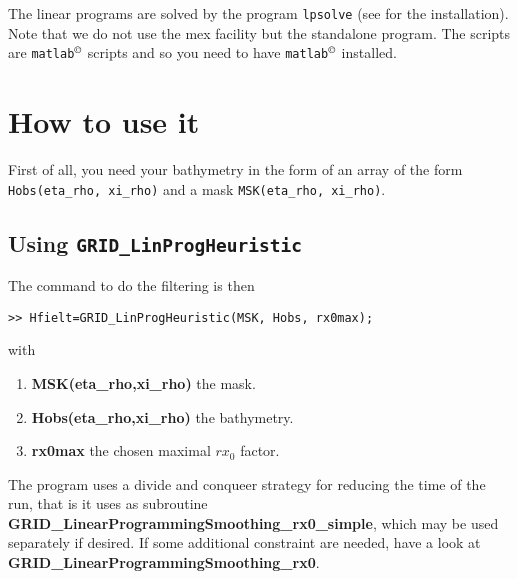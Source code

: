 \documentclass[12pt]{article}
\begin{document}
The linear programs are solved by the program {\tt lpsolve} (see \cite{lpsolve} for the installation). Note that we do not use the mex facility but the standalone program.
The scripts are {\tt matlab$^{\copyright}$} scripts and so you need to have {\tt matlab$^{\copyright}$} installed.



\section{How to use it}

First of all, you need your bathymetry in the form of an array of the
form {\tt Hobs(eta\_rho, xi\_rho)} and a mask {\tt MSK(eta\_rho, xi\_rho)}.





\subsection{Using {\tt GRID\_LinProgHeuristic}}

The command to do the filtering is then
\begin{verbatim}
>> Hfielt=GRID_LinProgHeuristic(MSK, Hobs, rx0max);
\end{verbatim}
with
\begin{enumerate}
\item {\bf MSK(eta\_rho,xi\_rho)} the mask.
\item {\bf Hobs(eta\_rho,xi\_rho)} the bathymetry.
\item {\bf rx0max} the chosen maximal $rx_0$ factor.
\end{enumerate}
The program uses a divide and conqueer strategy for reducing the time of
the run, that is it uses as subroutine {\bf GRID\_LinearProgrammingSmoothing\_rx0\_simple}, which may be used separately if desired.
If some additional constraint are needed, have a look at 
{\bf GRID\_LinearProgrammingSmoothing\_rx0}.
\end{document}
